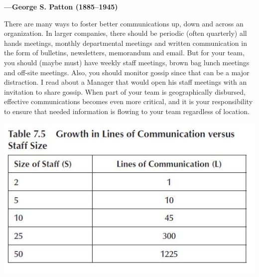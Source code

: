 \documentclass{book}
\begin{document}
\textbf{—George S. Patton (1885–1945)}

There are many ways to foster better communications up,
down and across an organization. In larger companies,
there should be periodic (often quarterly) all hands meetings,
monthly departmental meetings and written communication
in the form of bulletins, newsletters, memorandum
and email. But for your team, you should (maybe must)
have weekly staff meetings, brown bag lunch meetings and
off-site meetings.
Also, you should monitor gossip since that can be a major
distraction. I read about a Manager that would open his staff
meetings with an invitation to share gossip. When part of
your team is geographically disbursed, effective communications
becomes even more critical, and it is your responsibility
to ensure that needed information is flowing to your team
regardless of location.

\includegraphics{2.jpg}
\end{document}

